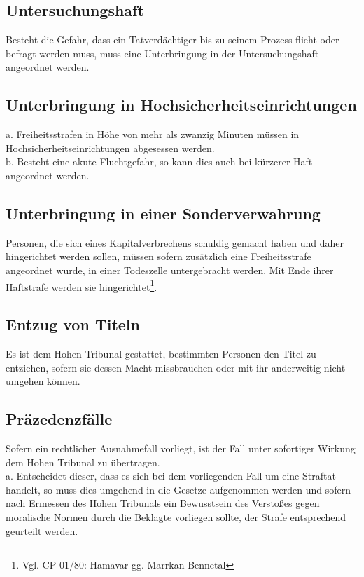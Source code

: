 \documentclass{article}
\begin{document}
\subsection{Untersuchungshaft}
Besteht die Gefahr, dass ein Tatverdächtiger bis zu seinem Prozess flieht oder befragt werden muss, muss eine Unterbringung in der Untersuchungshaft angeordnet werden.\\

\subsection{Unterbringung in Hochsicherheitseinrichtungen}
a.	Freiheitsstrafen in Höhe von mehr als zwanzig Minuten müssen in Hochsicherheitseinrichtungen abgesessen werden.\\
b.	Besteht eine akute Fluchtgefahr, so kann dies auch bei kürzerer Haft angeordnet werden.

\subsection{Unterbringung in einer Sonderverwahrung}
Personen, die sich eines Kapitalverbrechens schuldig gemacht haben und daher hingerichtet werden sollen, müssen sofern zusätzlich eine Freiheitsstrafe angeordnet wurde, in einer Todeszelle untergebracht werden. Mit Ende ihrer Haftstrafe werden sie hingerichtet\footnote{Vgl. CP-01/80: Hamavar gg. Marrkan-Bennetal}.

\subsection{Entzug von Titeln}
Es ist dem Hohen Tribunal gestattet, bestimmten Personen den Titel zu entziehen, sofern sie dessen Macht missbrauchen oder mit ihr anderweitig nicht umgehen können.

\subsection{Präzedenzfälle}
Sofern ein rechtlicher Ausnahmefall vorliegt, ist der Fall unter sofortiger Wirkung dem Hohen Tribunal zu übertragen.\\
a. Entscheidet dieser, dass es sich bei dem vorliegenden Fall um eine Straftat handelt, so muss dies umgehend in die Gesetze aufgenommen werden und
sofern nach Ermessen des Hohen Tribunals ein Bewusstsein des Verstoßes gegen moralische Normen durch die Beklagte vorliegen sollte, der Strafe entsprechend
geurteilt werden.
\end{document}
